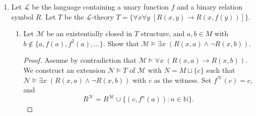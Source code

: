 \documentclass{article}
\begin{document}
\begin{enumerate}[label={\bf Q\arabic*:}]
\begin{proof}
      Assume by contradiction that $T$ is not model-complete. Then $T$ must
      have a model $\mathcal{M}$ that is not ec-closed in $T_\forall$
      (Theorem 11.14.3). Since models of $T_\forall$ are exactly the
      substructures of models of $T$ (Lemma 11.2), $\mathcal{M}$ must be
      embedded in some substructure $\mathcal{N}_0$ of $\mathcal{N}\models
      T$, where
      \[\mathcal{M}\not\leq_{\text{ec}}\mathcal{N}_0\leq\mathcal{N}\models
        T.\]
      Then $\mathcal{M}\leq\mathcal{N}$ since embeddings are transitive,
      but $\mathcal{M}$ cannot be ec-closed in $\mathcal{N}$, because
      \begin{align*}
        \mathcal{N}_0\models \exists\bar{x}\;
          \varphi(\bar{x},\bar{m}) &\Rightarrow
          \mathcal{N}\models \exists\bar{x}\;
          \varphi(\bar{x},\bar{m})
          &(\because\mathcal{N}_0\leq\mathcal{N};\; \text{where}\;
          \bar{m}\in M\; \text{and}\; \varphi\; \text{is quantifier-free}) \\
        &\Rightarrow\mathcal{M}\models \exists\bar{x}\;
          \varphi(\bar{x},\bar{m}), &(\text{assuming}\;
          \mathcal{M}\leq_{\text{ec}}\mathcal{N}) \\
      \end{align*}
      which would contradict
      $\mathcal{M}\not\leq_{\text{ec}}\mathcal{N}_0$. Thus we have an
      infinite model $\mathcal{M}$ of $T$ that is not ec-closed in
      $\mathcal{N}\models T$, which implies that $T$ has a model of
      cardinality $\kappa$ that is not ec-closed in $T$ (Lemma 11.15). This
      would contradict our claim in the first paragraph.
    \end{proof}

  \item Let $\mathcal{L}$ be the language containing a unary function $f$
    and a binary relation symbol $R$. Let $T$ be the $\mathcal{L}$-theory
    $T=\{\forall x\forall y\; [R(x,y)\rightarrow R(x,f(y))]\}$.

    \begin{enumerate}
      \item Let $\mathcal{M}$ be an existentially closed in $T$ structure,
        and $a,b\in M$ with $b\not\in\{a,f(a),f^2(a),\ldots\}$. Show that
        $\mathcal{M}\models \exists x\; (R(x,a)\wedge\neg R(x,b))$.

        \begin{proof}
          Assume by contradiction that $\mathcal{M}\models \forall x\;
          (R(x,a)\rightarrow R(x,b))$. We construct an extension
          $\mathcal{N}\models T$ of $\mathcal{M}$ with $N=M\sqcup\{c\}$
          such that $\mathcal{N}\models \exists x\; (R(x,a)\wedge\neg
          R(x,b))$ with $c$ as the witness. Set $f^\mathcal{N}(c)=c$, and
          \[R^\mathcal{N}= R^\mathcal{M} \cup
          \{(c,f^n(a)):n\in\mathbb{N}\}.\]


\end{proof}
\end{enumerate}
\end{enumerate}
\end{document}
